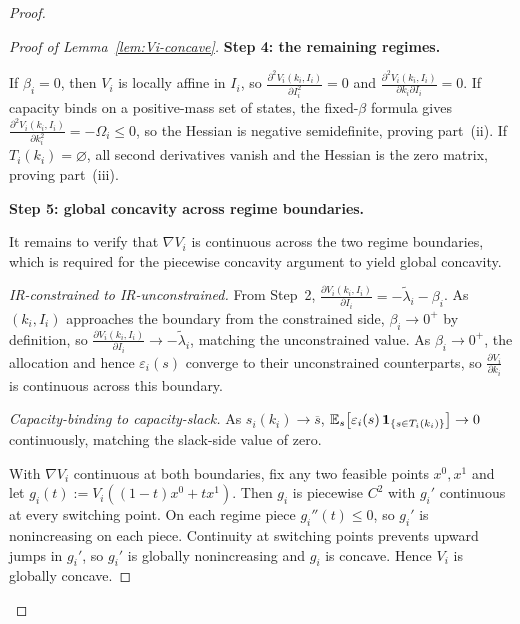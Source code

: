 \documentclass{class}
\begin{document}
\begin{proof}
\begin{proof}[Proof of Lemma~\ref{lem:Vi-concave}]
\noindent\textbf{Step 4: the remaining regimes.}

If $\beta_i=0$, then $V_i$ is locally affine in $I_i$, so $\frac{\partial^2 V_i(k_i,I_i)}{\partial  I_i^2}=0$ and $\frac{\partial^2 V_i(k_i,I_i)}{\partial  k_i\partial  I_i}=0$. If capacity binds on a positive-mass set of states, the fixed-$\beta$ formula gives $\frac{\partial^2 V_i(k_i,I_i)}{\partial  k_i^2}=-\Omega_i\le 0$, so the Hessian is negative semidefinite, proving part~(ii). If $T_i(k_i)=\varnothing$, all second derivatives vanish and the Hessian is the zero matrix, proving part~(iii).


\noindent\textbf{Step 5: global concavity across regime boundaries.}

It remains to verify that $\nabla V_i$ is continuous across the two regime boundaries, which is required for the piecewise concavity argument to yield global concavity.

\textit{IR-constrained to IR-unconstrained.} From Step~2, $\frac{\partial V_i(k_i,I_i)}{\partial  I_i}=-\tilde\lambda_i-\beta_i$. As $(k_i,I_i)$ approaches the boundary from the constrained side, $\beta_i\to 0^+$ by definition, so $\frac{\partial V_i(k_i,I_i)}{\partial  I_i}\to -\tilde\lambda_i$, matching the unconstrained value. As $\beta_i\to 0^+$, the allocation and hence $\varepsilon_i(s)$ converge to their unconstrained counterparts, so $\frac{\partial V_i}{\partial k_i}$ is continuous across this boundary.

\textit{Capacity-binding to capacity-slack.} As $s_i(k_i)\to\overline s$, $\mathbb{E}_s\!\left[\varepsilon_i(s)\,\mathbf{1}_{\{s\in T_i(k_i)\}}\right]\to 0$ continuously, matching the slack-side value of zero.

With $\nabla V_i$ continuous at both boundaries, fix any two feasible points $x^0,x^1$ and let $g_i(t):=V_i((1-t)x^0+tx^1)$. Then $g_i$ is piecewise $C^2$ with $g_i'$ continuous at every switching point. On each regime piece $g_i''(t)\le 0$, so $g_i'$ is nonincreasing on each piece. Continuity at switching points prevents upward jumps in $g_i'$, so $g_i'$ is globally nonincreasing and $g_i$ is concave. Hence $V_i$ is globally concave.
\end{proof}
\end{proof}
\end{document}
